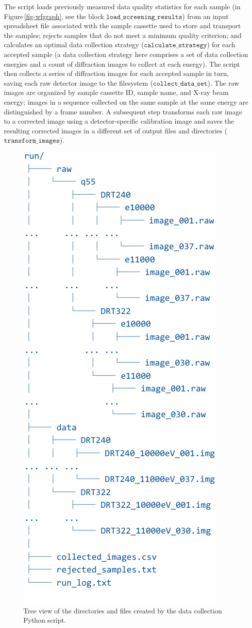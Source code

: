 \documentclass[letterpaper,twocolumn,10pt]{article}
\newcommand{\Figref}[1]{Figure\,\ref{#1}}
\newcommand{\code}[1]{\ensuremath{\mathtt{#1}}}
\begin{document}
The script loads previously measured data quality statistics for each
sample (in \Figref{fig-wfgraph}, see the block
\code{load\_screening\_results}) from an input spreadsheet file
associated with the sample cassette used to store and transport the
samples; rejects samples that do not meet a minimum quality criterion;
and calculates an optimal data collection strategy
(\code{calculate\_strategy}) for each accepted sample (a data
collection strategy here comprises a set of data collection energies
and a count of diffraction images to collect at each energy). The
script then collects a series of diffraction images for each accepted
sample in turn, saving each raw detector image to the filesystem
(\code{collect\_data\_set}). The raw images are organized by sample
cassette ID, sample name, and X-ray beam energy; images in a sequence
collected on the same sample at the same energy are distinguished by a
frame number. A subsequent step transforms each raw image to a
corrected image using a detector-specific calibration image and saves
the resulting corrected images in a different set of output files and
directories (\code{transform\_images}).

\begin{figure}[thb]
  \centering
  \includegraphics[width=.3\textwidth]{tree-abbrev-crop.pdf}
  \caption{\small Tree view of the directories and files created by
    the data collection Python script.}
  \label{fig-data-tree}
\end{figure}


\end{document}
